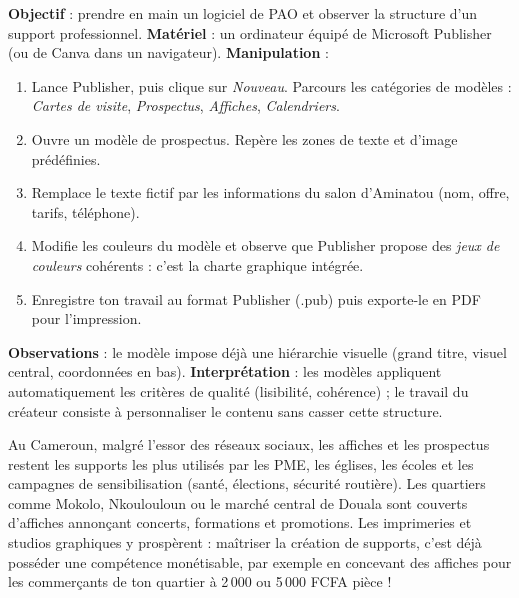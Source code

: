 \documentclass[11pt]{article}
\begin{document}
\begin{experience}
\textbf{Objectif} : prendre en main un logiciel de PAO et observer la structure d'un support professionnel.
\textbf{Matériel} : un ordinateur équipé de Microsoft Publisher (ou de Canva dans un navigateur).
\textbf{Manipulation} :
\begin{enumerate}
  \item Lance Publisher, puis clique sur \emph{Nouveau}. Parcours les catégories de modèles : \emph{Cartes de visite}, \emph{Prospectus}, \emph{Affiches}, \emph{Calendriers}.
  \item Ouvre un modèle de prospectus. Repère les zones de texte et d'image prédéfinies.
  \item Remplace le texte fictif par les informations du salon d'Aminatou (nom, offre, tarifs, téléphone).
  \item Modifie les couleurs du modèle et observe que Publisher propose des \emph{jeux de couleurs} cohérents : c'est la charte graphique intégrée.
  \item Enregistre ton travail au format Publisher (.pub) puis exporte-le en PDF pour l'impression.
\end{enumerate}
\textbf{Observations} : le modèle impose déjà une hiérarchie visuelle (grand titre, visuel central, coordonnées en bas). \textbf{Interprétation} : les modèles appliquent automatiquement les critères de qualité (lisibilité, cohérence) ; le travail du créateur consiste à personnaliser le contenu sans casser cette structure.
\end{experience}

\begin{savaistu}
Au Cameroun, malgré l'essor des réseaux sociaux, les affiches et les prospectus restent les supports les plus utilisés par les PME, les églises, les écoles et les campagnes de sensibilisation (santé, élections, sécurité routière). Les quartiers comme Mokolo, Nkoulouloun ou le marché central de Douala sont couverts d'affiches annonçant concerts, formations et promotions. Les imprimeries et studios graphiques y prospèrent : maîtriser la création de supports, c'est déjà posséder une compétence monétisable, par exemple en concevant des affiches pour les commerçants de ton quartier à 2\,000 ou 5\,000 FCFA pièce !
\end{savaistu}
\end{document}
